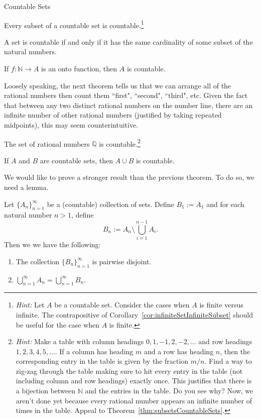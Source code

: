 \begin{section}{Countable Sets}
\begin{theorem}\label{thm:subsetsCountableSets}
Every subset of a countable set is countable.\footnote{\emph{Hint:} Let $A$ be a countable set.  Consider the cases when $A$ is finite versus infinite. The contrapositive of Corollary~\ref{cor:infiniteSetInfiniteSubset} should be useful for the case when $A$ is finite.}
\end{theorem}

\begin{theorem}
A set is countable if and only if it has the same cardinality of some subset of the natural numbers.
\end{theorem}

\begin{theorem}
If $f:\mathbb{N}\to A$ is an onto function, then $A$ is countable.
\end{theorem}

Loosely speaking, the next theorem tells us that we can arrange all of the rational numbers then count them ``first", ``second", ``third", etc. Given the fact that between any two distinct rational numbers on the number line, there are an infinite number of other rational numbers (justified by taking repeated midpoints), this may seem counterintuitive.  

\begin{theorem}
The set of rational numbers $\mathbb{Q}$ is countable.\footnote{\emph{Hint:} Make a table with column headings $0, 1, -1, 2,-2,\ldots$ and row headings $1,2,3,4,5,\ldots$.  If a column has heading $m$ and a row has heading $n$, then the corresponding entry in the table is given by the fraction $m/n$.  Find a way to zig-zag through the table making sure to hit every entry in the table (not including column and row headings) exactly once.  This justifies that there is a bijection between $\mathbb{N}$ and the entries in the table.  Do you see why?  Now, we aren't done yet because every rational number appears an infinite number of times in the table. Appeal to Theorem~\ref{thm:subsetsCountableSets}.}
\end{theorem}

\begin{theorem}
If $A$ and $B$ are countable sets, then $A\cup B$ is countable.
\end{theorem}

We would like to prove a stronger result than the previous theorem. To do so, we need a lemma.

\begin{lemma}
Let $\{A_n\}_{n=1}^{\infty}$ be a (countable) collection of sets. Define $B_1:=A_1$ and for each natural number $n>1$, define
\[
B_n:=A_n\setminus \bigcup_{i=1}^{n-1}A_i.
\]
Then we we have the following:
\begin{enumerate}[label=\textrm{(\alph*)}]
\item The collection $\{B_n\}_{n=1}^{\infty}$ is pairwise disjoint.
\item $\displaystyle \bigcup_{n=1}^{\infty}A_n =\bigcup_{n=1}^{\infty}B_n$.
\end{enumerate}
\end{lemma}


\end{section}
